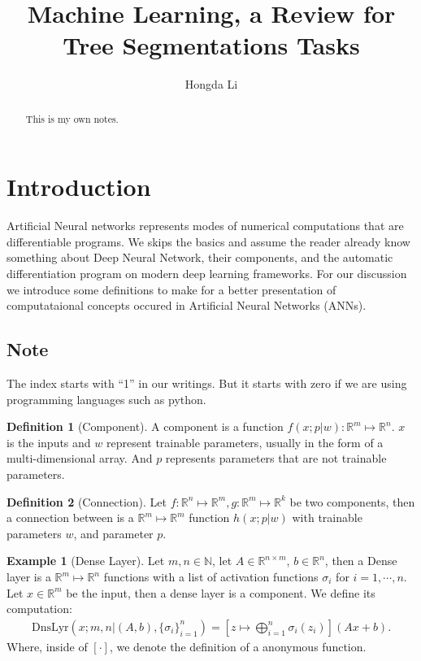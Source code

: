 \documentclass[]{article}
\title{Machine Learning, a Review for Tree Segmentations Tasks}
\author{Hongda Li}
\theoremstyle{definition}
\newtheorem{definition}{Definition}
\newtheorem{example}{Example}[subsection]
\numberwithin{equation}{subsection}
\begin{document}
\maketitle

\begin{abstract}
    This is my own notes. 
\end{abstract}


\section{Introduction}
    Artificial Neural networks represents modes of numerical computations that are differentiable programs. 
    We skips the basics and assume the reader already know something about Deep Neural Network, their components, and the automatic differentiation program on modern deep learning frameworks. 
    For our discussion we introduce some definitions to make for a better presentation of computataional concepts occured in Artificial Neural Networks (ANNs). 
    \par
    \subsection{Note}
        The index starts with ``1'' in our writings. 
        But it starts with zero if we are using programming languages such as python. 

    \begin{definition}[Component]
        A component is a function $f(x; p|w): \mathbb R^m \mapsto \mathbb R^n$. 
        $x$ is the inputs and $w$ represent trainable parameters, usually in the form of a multi-dimensional array. 
        And $p$ represents parameters that are not trainable parameters. 
        
    \end{definition}
    \begin{definition}[Connection]
        Let $f:\mathbb R^n \mapsto \mathbb R^m, g: \mathbb R^m \mapsto \mathbb R^k$ be two components, then a connection between is a $\mathbb R^m \mapsto \mathbb R^m$ function $h(x; p | w)$ with trainable parameters $w$, and parameter $p$. 
    \end{definition}


    \begin{example}[Dense Layer]
        Let $m, n \in \mathbb N$, let $A \in \mathbb R^{n\times m}$, $b \in \mathbb R^n$, then a Dense layer is a $\mathbb R^m \mapsto \mathbb R^n$ functions with a list of activation functions $\sigma_i$ for $i = 1, \cdots, n$. 
        Let $x \in \mathbb R^m$ be the input, then a dense layer is a component. We define its computation: 
        $$
        \begin{aligned}
            \text{DnsLyr}(x ; m, n | (A, b), \{\sigma_i\}_{i=1}^n) = 
            \left[
                z \mapsto \bigoplus_{i = 1}^n\sigma_i(z_i)
            \right]
            \left(
                Ax + b
            \right). 
        \end{aligned}
        $$
        Where, inside of $[\cdot]$, we denote the definition of a anonymous function. 
    \end{example}
    
\end{document}
